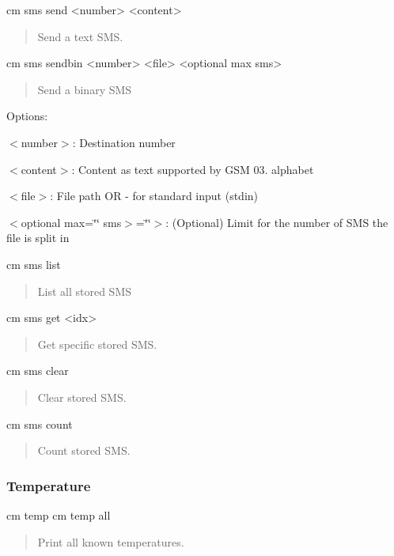 \begin{DoxyVerb}cm sms send <number> <content> \end{DoxyVerb}
 \begin{quote}
Send a text S\+M\+S. \end{quote}


\begin{DoxyVerb}cm sms sendbin <number> <file> <optional max sms> \end{DoxyVerb}
 \begin{quote}
Send a binary S\+M\+S \end{quote}


Options\+:
\begin{DoxyItemize}
\item $<$number$>$\+: Destination number
\item $<$content$>$\+: Content as text supported by G\+S\+M 03. alphabet
\item $<$file$>$\+: File path O\+R -\/ for standard input (stdin)
\item $<$optional max=\char`\"{}\char`\"{} sms$>$=\char`\"{}\char`\"{}$>$\+: (Optional) Limit for the number of S\+M\+S the file is split in
\end{DoxyItemize}

\begin{DoxyVerb}cm sms list \end{DoxyVerb}
 \begin{quote}
List all stored S\+M\+S \end{quote}


\begin{DoxyVerb}cm sms get <idx> \end{DoxyVerb}
 \begin{quote}
Get specific stored S\+M\+S. \end{quote}


\begin{DoxyVerb}cm sms clear \end{DoxyVerb}
 \begin{quote}
Clear stored S\+M\+S. \end{quote}


\begin{DoxyVerb}cm sms count \end{DoxyVerb}
 \begin{quote}
Count stored S\+M\+S. \end{quote}
\hypertarget{tools_target_cm_toolsTarget_cm_temp}{}\subsubsection{Temperature}\label{tools_target_cm_toolsTarget_cm_temp}
\begin{DoxyVerb}cm temp
cm temp all \end{DoxyVerb}
 \begin{quote}
Print all known temperatures. \end{quote}


